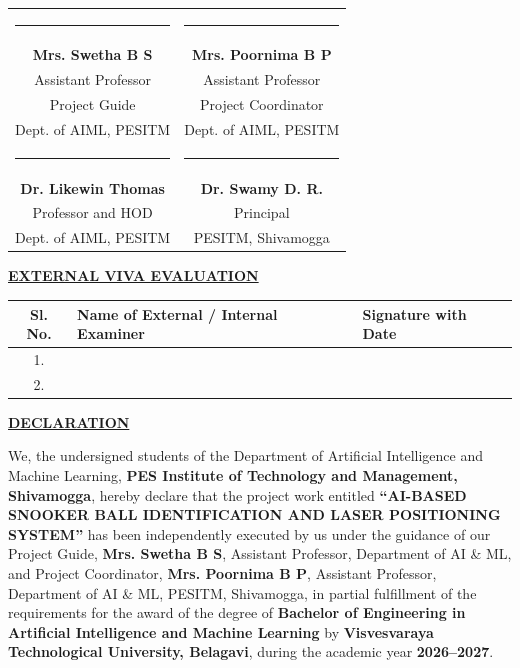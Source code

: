\vspace{0.25cm}
\noindent
\begin{tabular}{cc}
    \rule{5.8cm}{0.4pt} & \rule{5.8cm}{0.4pt} \\
    \textbf{Mrs. Swetha B S} & \textbf{Mrs. Poornima B P} \\
    Assistant Professor & Assistant Professor \\
    Project Guide & Project Coordinator \\
    Dept. of AIML, PESITM & Dept. of AIML, PESITM \\[0.45cm]
    \rule{5.8cm}{0.4pt} & \rule{5.8cm}{0.4pt} \\
    \textbf{Dr. Likewin Thomas} & \textbf{Dr. Swamy D. R.} \\
    Professor and HOD & Principal \\
    Dept. of AIML, PESITM & PESITM, Shivamogga \\
\end{tabular}

\vspace{0.2cm}
\begin{center}
    \textbf{\underline{EXTERNAL VIVA EVALUATION}}
\end{center}
\vspace{0.05cm}
\noindent
\begin{tabular}{|c|p{7.6cm}|p{4.8cm}|}
    \hline
    \textbf{Sl. No.} & \textbf{Name of External / Internal Examiner} & \textbf{Signature with Date} \\
    \hline
    \rule{0pt}{0.55cm} 1. & & \\[0.2cm]
    \hline
    \rule{0pt}{0.55cm} 2. & & \\[0.2cm]
    \hline
\end{tabular}

\newpage
\thispagestyle{frontmatterstyle}
\begin{center}
    {\Large \textbf{\underline{DECLARATION}}}\\[0.8cm]
\end{center}

\noindent We, the undersigned students of the Department of Artificial Intelligence and Machine Learning, \textbf{PES Institute of Technology and Management, Shivamogga}, hereby declare that the project work entitled \textbf{``AI-BASED SNOOKER BALL IDENTIFICATION AND LASER POSITIONING SYSTEM''} has been independently executed by us under the guidance of our Project Guide, \textbf{Mrs. Swetha B S}, Assistant Professor, Department of AI \& ML, and Project Coordinator, \textbf{Mrs. Poornima B P}, Assistant Professor, Department of AI \& ML, PESITM, Shivamogga, in partial fulfillment of the requirements for the award of the degree of \textbf{Bachelor of Engineering in Artificial Intelligence and Machine Learning} by \textbf{Visvesvaraya Technological University, Belagavi}, during the academic year \textbf{2026--2027}.

